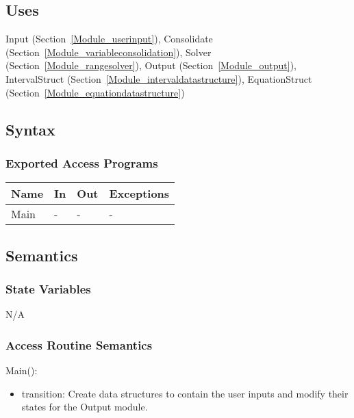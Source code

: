 \documentclass[12pt, titlepage]{article}
\begin{document}
\subsection{Uses}

Input (Section~\ref{Module_userinput}), Consolidate 
(Section~\ref{Module_variableconsolidation}), Solver 
(Section~\ref{Module_rangesolver}), Output (Section~\ref{Module_output}), 
IntervalStruct (Section~\ref{Module_intervaldatastructure}), EquationStruct 
(Section~\ref{Module_equationdatastructure})


\subsection{Syntax}

\subsubsection{Exported Access Programs}

\begin{center}
\begin{tabular}{p{3cm} p{3cm} p{3cm} p{5cm}}
\hline
\textbf{Name} & \textbf{In} & \textbf{Out} & \textbf{Exceptions} \\
\hline
Main & - & - & - \\
\hline
\end{tabular}
\end{center}

\subsection{Semantics}

\subsubsection{State Variables}

N/A

\subsubsection{Access Routine Semantics}

\noindent Main():
\begin{itemize}
\item transition: Create data structures to contain the user inputs and modify 
their states for the Output module.
\end{itemize}
\end{document}
